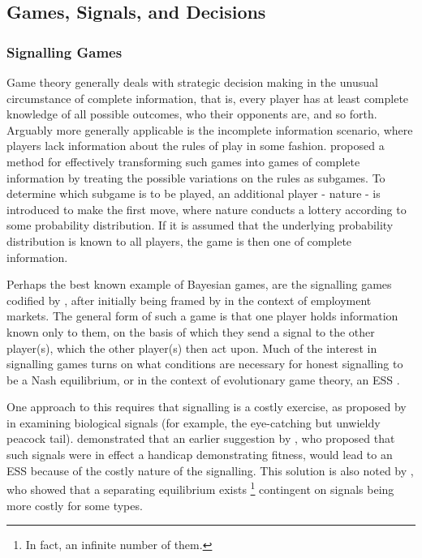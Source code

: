 \subsection{Games, Signals, and Decisions}




\subsubsection{Signalling Games}



Game theory generally deals with strategic decision making in the
unusual circumstance of complete information, that is, every player
has at least complete knowledge of all possible outcomes, who their
opponents are, and so forth. Arguably more generally applicable is
the incomplete information scenario, where players lack information
about the rules of play in some fashion. \citet{Harsanyi1967} proposed
a method for effectively transforming such games into games of complete
information by treating the possible variations on the rules as subgames.
To determine which subgame is to be played, an additional player -
nature - is introduced to make the first move, where nature conducts
a lottery according to some probability distribution. If it is assumed
that the underlying probability distribution is known to all players,
the game is then one of complete information. 

Perhaps the best known example of Bayesian games, are the signalling
games codified by \citet{Kreps1987}, after initially being framed
by \citet{Spence1973} in the context of employment markets. The general
form of such a game is that one player holds information known only
to them, on the basis of which they send a signal to the other player(s),
which the other player(s) then act upon. Much of the interest in signalling
games turns on what conditions are necessary for honest signalling
to be a Nash equilibrium, or in the context of evolutionary game theory,
an \ac{ESS} . 

One approach to this requires that signalling is a costly exercise,
as proposed by \citet{Grafen1990} in examining biological signals
(for example, the eye-catching but unwieldy peacock tail). \citeauthor{Grafen1990}
demonstrated that an earlier suggestion by \citet{Zahavi1975}, who
proposed that such signals were in effect a handicap demonstrating
fitness, would lead to an \ac{ESS} because of the costly nature of
the signalling. This solution is also noted by \citet{Spence1973},
who showed that a separating equilibrium exists%
\footnote{In fact, an infinite number of them.%
} contingent on signals being more costly for some types.

